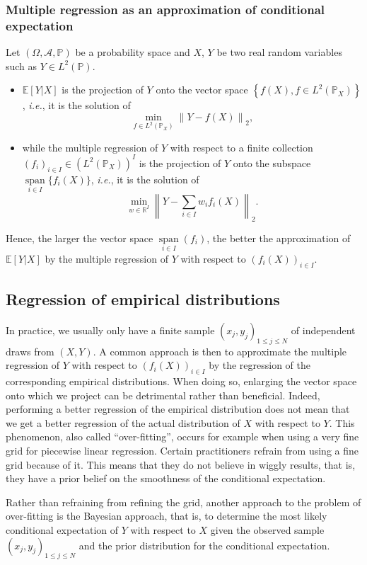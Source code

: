 \documentclass[a4paper]{article}
\newcommand{\1}{\textbf{1}}
\newcommand{\R}{\mathbb{R}}
\newcommand{\E}{\mathbb{E}}
\newcommand{\PP}{\mathbb{P}}
\newcommand{\sspan}{\operatorname{span}}
\begin{document}
\subsubsection*{Multiple regression as an approximation of conditional expectation}
\par Let $(\Omega, \mathcal{A}, \PP)$ be a probability space and $X$, $Y$ be two real random variables such as $Y \in L^2(\PP)$.
\vspace{2mm}
\begin{itemize}
\item $\E[Y|X]$ is the projection of $Y$ onto the vector space $\left\{f(X), f \in L^2(\PP_X) \right\}$, \textit{i.e.}, it is the solution of
$$
\min\limits_{f \in L^2\left(\PP_X\right)} \left\| Y - f(X) \right\|_2,
$$
\item while the multiple regression of $Y$ with respect to a finite collection $(f_i)_{i \in I} \in \left(L^2(\PP_X)\right)^I$ is the projection of $Y$ onto the subspace $\sspan\limits_{i \in I}\{f_i(X)\}$, \textit{i.e.}, it is the solution of
$$
\min\limits_{w \in \R^I} \left\| Y - \sum\limits_{i\in I} w_i f_i(X) \right\|_2.
$$
\end{itemize}
\vspace{2mm}
\par \noindent Hence, the larger the vector space $\sspan\limits_{i \in I} (f_i)$, the better the approximation of $\E[Y |X]$ by the multiple regression of $Y$ with respect to $(f_i(X))_{i \in I}$. 
\subsection{Regression of empirical distributions}
\par In practice, we usually only have a finite sample $(x_j, y_j)_{1 \leq j \leq N}$ of independent draws from $(X,Y)$. A common approach is then to approximate the multiple regression of $Y$ with respect to $(f_i(X))_{i \in I}$ by the regression of the corresponding empirical distributions. When doing so, enlarging the vector space onto which we project can be detrimental rather than beneficial. Indeed, performing a better regression of the empirical distribution does not mean that we get a better regression of the actual distribution of $X$ with respect to $Y$. This phenomenon, also called ``over-fitting'', occurs for example when using a very fine grid for piecewise linear regression. Certain practitioners refrain from using a fine grid because of it. This means that they do not believe in wiggly results, that is, they have a prior belief on the smoothness of the conditional expectation. 
\par Rather than refraining from refining the grid, another approach to the problem of over-fitting is the Bayesian approach, that is, to determine the most likely conditional expectation of $Y$ with respect to $X$ given the observed sample $(x_j, y_j)_{1 \leq j \leq N}$ and the prior distribution for the conditional expectation.
\end{document}
